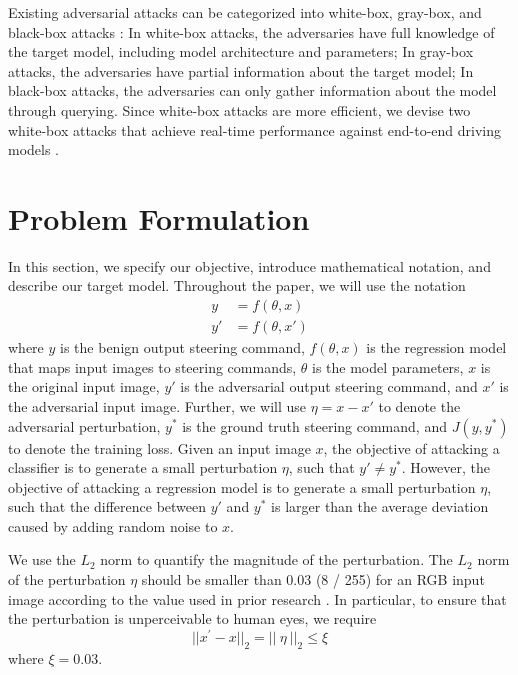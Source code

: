 Existing adversarial attacks can be categorized into white-box, gray-box, and black-box attacks \citep{REN2020346}: In white-box attacks, the adversaries have full knowledge of the target model, including model architecture and parameters; In gray-box attacks, the adversaries have partial information about the target model; In black-box attacks, the adversaries can only gather information about the model through querying. Since white-box attacks are more efficient, we devise two white-box attacks that achieve real-time performance against end-to-end driving models .

\clearpage

\section{Problem Formulation}
\label{section_problem_formulation}

In this section, we specify our objective, introduce mathematical notation, and describe our target model. Throughout the paper, we will use the notation
\begin{align}
y&=f(\theta, x) \\
y'&=f(\theta, x')
\end{align}
where $y$ is the benign output steering command, $f(\theta, x)$ is the regression model that maps input images to steering commands, $\theta$ is the model parameters, $x$ is the original input image, $y'$ is the adversarial output steering command, and $x'$ is the adversarial input image. Further, we will use $\eta=x-x'$ to denote the adversarial perturbation, $y^{*}$ is the ground truth steering command, and $J(y, y^{*})$ to denote the training loss. Given an input image $x$, the objective of attacking a classifier is to generate a small perturbation $\eta$, such that $y' \neq y^{*}$. However, the objective of attacking a regression model is to generate a small perturbation $\eta$, such that the difference between $y'$ and $y^{*}$ is larger than the average deviation caused by adding random noise to $x$. 

We use the $L_2$ norm to quantify the magnitude of the perturbation. The $L_2$ norm of the perturbation $\eta$ should be smaller than 0.03 (8 / 255) for an RGB input image according to the value used in prior research \citep{chow2020adversarial} \citep{ACFH2020square}. In particular, to ensure that the perturbation is unperceivable to human eyes, we require \begin{equation}
||x^{'}-x||_{2} = ||\ {\eta}\ ||_{2} \leq \xi
\end{equation}
where $\xi = 0.03$.

